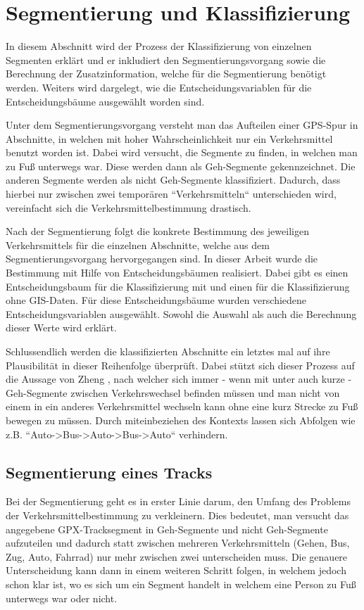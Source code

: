 \chapter{Segmentierung und Klassifizierung}
In diesem Abschnitt wird der Prozess der Klassifizierung von einzelnen Segmenten erklärt und er inkludiert den Segmentierungsvorgang sowie die Berechnung der Zusatzinformation, welche für die Segmentierung benötigt werden. Weiters wird dargelegt, wie die Entscheidungsvariablen für die Entscheidungsbäume ausgewählt worden sind. 

Unter dem Segmentierungsvorgang versteht man das Aufteilen einer GPS-Spur in Abschnitte, in welchen mit hoher Wahrscheinlichkeit nur ein Verkehrsmittel benutzt worden ist. Dabei wird versucht, die Segmente zu finden, in welchen man zu Fuß unterwegs war. Diese werden dann als Geh-Segmente gekennzeichnet. Die anderen Segmente werden als nicht Geh-Segmente klassifiziert. Dadurch, dass hierbei nur zwischen zwei temporären ``Verkehrsmitteln`` unterschieden wird, vereinfacht sich die  Verkehrsmittelbestimmung drastisch.

Nach der Segmentierung folgt die konkrete Bestimmung des jeweiligen Verkehrsmittels für die einzelnen Abschnitte, welche aus dem Segmentierungsvorgang hervorgegangen sind. In dieser Arbeit wurde die Bestimmung mit Hilfe von Entscheidungsbäumen realisiert. Dabei gibt es einen Entscheidungsbaum für die Klassifizierung mit und einen für die Klassifizierung ohne GIS-Daten. Für diese Entscheidungsbäume wurden verschiedene Entscheidungsvariablen ausgewählt. Sowohl die Auswahl als auch die Berechnung dieser Werte wird erklärt.

Schlussendlich werden die klassifizierten Abschnitte ein letztes mal auf ihre Plausibilität in dieser Reihenfolge überprüft. Dabei stützt sich dieser Prozess auf die Aussage von Zheng \cite{zheng_understanding_2010}, nach welcher sich immer - wenn mit unter auch kurze - Geh-Segmente zwischen Verkehrswechsel befinden müssen und man nicht von einem in ein anderes Verkehrsmittel wechseln kann ohne eine kurz Strecke zu Fuß bewegen zu müssen. Durch miteinbeziehen des Kontexts lassen sich Abfolgen wie z.B. ``Auto->Bus->Auto->Bus->Auto`` verhindern.  
\clearpage

\section{Segmentierung eines Tracks}
\label{segmentierung}
Bei der Segmentierung geht es in erster Linie darum, den Umfang des Problems der Verkehrsmittelbestimmung zu verkleinern. Dies bedeutet, man versucht das angegebene GPX-Tracksegment in Geh-Segmente und nicht Geh-Segmente aufzuteilen und dadurch statt zwischen mehreren Verkehrsmitteln (Gehen, Bus, Zug, Auto, Fahrrad) nur mehr zwischen zwei unterscheiden muss. Die genauere Unterscheidung kann dann in einem weiteren Schritt folgen, in welchem jedoch schon klar ist, wo es sich um ein Segment handelt in welchem eine Person zu Fuß unterwegs war oder nicht. 

